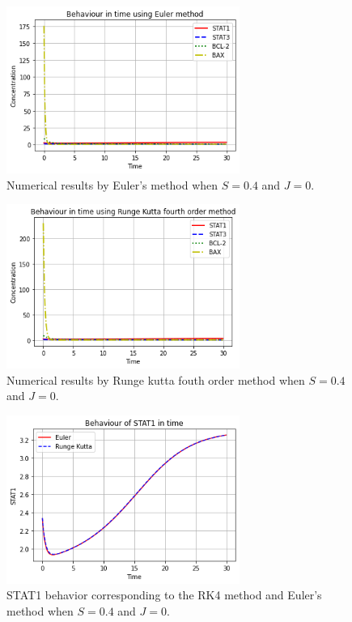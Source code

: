  \begin{figure}[hbt!]
	\centering
	\begin{framed}
	\includegraphics[width=0.68\textwidth]{Figures/C/N1.png}
		\end{framed}
	\caption{Numerical results  by Euler's method when $S =0.4$ and $J=0$.}
	\label{r13}
\end{figure}

\begin{figure}[hbt!]
	\centering
	\begin{framed}
	\includegraphics[width=0.68\textwidth]{Figures/C/N2.png}
		\end{framed}
	\caption{Numerical results  by Runge kutta fouth order method when $S =0.4$ and $J=0$. }
	\label{r14}
\end{figure}

\begin{figure}[hbt!]
	\centering
	\begin{framed}
	\includegraphics[width=0.68\textwidth]{Figures/C/N3.png}
		\end{framed}
	\caption{STAT1 behavior corresponding to the RK4 method and Euler's method when $S =0.4$ and $J=0$.}
	\label{r15}
\end{figure}

